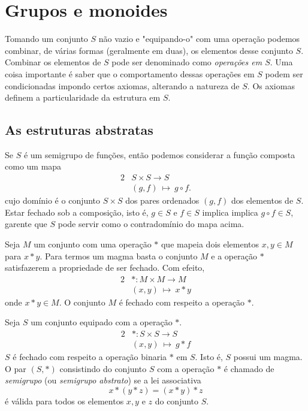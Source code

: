 \section{Grupos e monoides}
   Tomando um conjunto $S$ não vazio e "equipando-o" com uma operação podemos combinar, de várias formas (geralmente em duas), os elementos desse conjunto $S$. Combinar os elementos de $S$ pode ser denominado como \textit{operações em $S$}. Uma coisa importante é saber que o comportamento dessas operações em $S$ podem ser condicionadas impondo certos axiomas, alterando a natureza de $S$. Os axiomas definem a particularidade da estrutura em $S$.
   \subsection{As estruturas abstratas}
      Se $S$ é um semigrupo de funções, então podemos considerar a função composta como um mapa
      \begin{alignat}{2}
         &S \times S \to S \nonumber\\
         &\left(g,f\right)\ \mapsto\ g \circ f.
         \nonumber
      \end{alignat}
      cujo domínio é o conjunto $S \times S$ dos pares ordenados $(g,f)$ dos elementos de $S$. Estar fechado sob a composição, isto é, $g\in S$ e $f\in S$ implica implica $g\circ f \in S$, garente que $S$ pode servir como o contradomínio do mapa acima.

      \begin{definition}[Magma]
         Seja $M$ um conjunto com uma operação $*$ que mapeia dois elementos $x,y \in M$ para $x * y$. Para termos um magma basta o conjunto $M$ e a operação $*$ satisfazerem a propriedade de ser fechado. Com efeito, 
         \begin{alignat}{2}
            &*: M \times M \to M \nonumber\\
            &\left(x,y\right)\ \mapsto\ x * y
            \nonumber
         \end{alignat}
         onde $x*y \in M$. O conjunto $M$ é fechado com respeito a operação $*$.
      \end{definition}
      \begin{definition}[Semigrupos]
         Seja $S$ um conjunto equipado com a operação $*$.
         \begin{alignat}{2}
            &*:S \times S \to S \nonumber\\
            &\left(x,y\right)\ \mapsto\ g * f
            \nonumber
         \end{alignat}
         $S$ é fechado com respeito a operação binaria $*$ em $S$. Isto é, $S$ possui um magma. O par $\left(S,* \right)$ consistindo do conjunto $S$ com a operação $*$ é chamado de \emph{semigrupo} (ou \emph{semigrupo abstrato}) se a lei associativa $$x * (y * z) = (x * y) * z$$ é válida para todos os elementos $x,y$ e $z$ do conjunto $S$.
      \end{definition}


